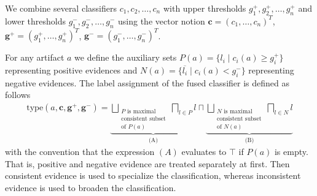 
We combine several classifiers $c_1,c_2,\dots, c_n$ with upper thresholds $g_1^+, g_2^+, \dots, g_n^+$ and lower thresholds $g_1^-, g_2^-, \dots, g_n^-$ using the vector notion $\mathbf c = (c_1,\dots,c_n)^T$, $\mathbf g^+=(g_1^+,\dots, g_n^+)^T$, $\mathbf g^-=(g_1^-,\dots,g_n^-)^T$. 

For any artifact $a$ we define the auxiliary sets
$P(a) = \{l_i\mid c_i(a) \geq g_i^+\}$ representing positive evidences and
$N(a) = \{\overline{l_i}\mid c_i(a) < g_i^-\}$ representing negative evidences.
The label assignment of the fused classifier is defined as follows
\begin{gather*}
    \mathrm{type}(a,\mathbf c, \mathbf g^+,\mathbf g^-) = 
    \underbrace{
    \bigsqcup\limits_{\substack{\text{$P$ is maximal}\\\text{consistent subset}\\\text{of $P(a)$}}} \bigsqcap\limits_{l \in P} l}_{\text{(A)}}
    \sqcap
    \underbrace{
    \bigsqcup\limits_{\substack{\text{$N$ is maximal}\\\text{consistent subset}\\\text{of $N(a)$}}} \bigsqcap\limits_{l \in N} l}_{\text{(B)}}
\end{gather*}
with the convention that the expression $(A)$ evaluates to $\top$ if $P(a)$ is empty.
That is, positive and negative evidence are treated separately at first. 
Then consistent evidence is used to specialize the classification, whereas inconsistent evidence is used to broaden the classification.


